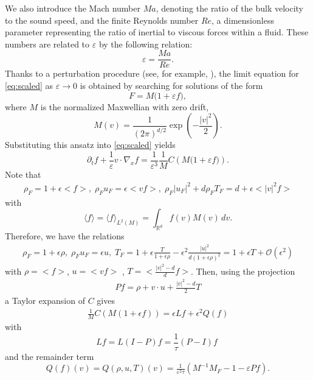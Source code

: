 \documentclass[final,11pt]{siamart251216}
\numberwithin{equation}{section}
\theoremstyle{definition}
\theoremstyle{remark}
\begin{document}
We also introduce the Mach number $Ma$, denoting the ratio of the bulk velocity to the sound speed, and the finite Reynolds number $Re$, a dimensionless parameter representing the ratio of inertial to viscous forces within a fluid.
These numbers are related to $\varepsilon$ by the following relation:
\begin{equation}
	\varepsilon = \frac{Ma}{Re}. \label{eq:eps-ma-re}
\end{equation}
Thanks to a perturbation procedure (see, for example, \cite{Levermore91,Esposito}),
the limit equation for \eqref{eq:scaled} as $\varepsilon \to 0$ is obtained by searching for solutions of the form
\begin{equation}\label{eq:ansatz}
	F = M \big(1 + \varepsilon f \big),
\end{equation}
where $M$ is the normalized Maxwellian with zero drift,
\[
M(v) = \frac{1}{(2\pi)^{d/2}} \exp\!\left(-\frac{|v|^2}{2}\right).
\]
Substituting this ansatz into \eqref{eq:scaled} yields
\begin{equation}
	 \partial_t f + \frac{1}{\varepsilon} v \cdot \nabla_x f
	= \frac{1}{\varepsilon^3}\frac{1}{M}C\left(M \big(1 + \varepsilon f \big)\right).
\end{equation}
Note that 
\begin{align*}
	\rho_F = 1+ \epsilon <f>, \; \rho_F u_F = \epsilon < vf>, \; \rho_F \vert u_F\vert^2 + d \rho_F T_F= d+ \epsilon < \vert v \vert^2 f>
\end{align*}
with
\[
\langle f \rangle = \langle f \rangle_{L^2(M)} = \int_{\mathbb{R}^d} f(v) M(v) \, dv.
\]
Therefore, we have the relations
\begin{align}
	\label{relation}
	\rho_F = 1+ \epsilon \rho, \; \rho_F u_F = \epsilon u, \;  T_F= 1+ \epsilon \frac{T}{1+\epsilon \rho} - \epsilon^2 \frac{\vert u\vert^2}{d(1+\epsilon \rho)^2}=1+ \epsilon T + \mathcal{O}(\epsilon^2)
\end{align}
with
$  \rho = <f> $, $ u = <v f>$ , $  T = <\frac{\vert v\vert^2-d}{d}f> $. 
Then,  using the  projection
\begin{align}
	\label{projection}Pf=  \rho +  v \cdot u+ \frac{\vert v\vert^2-d}{2} T 
\end{align}
a Taylor expansion of $C$ gives 
\begin{align}
	\label{expansion}
	\frac{1}{M} C(M(1+\epsilon f)) = \epsilon L f + \epsilon^2 Q (f) 
\end{align}
with
$$
Lf = L(I-P)f= \frac{1}{\tau}(P-I) f \; 
$$
and the remainder term
\[
Q(f)(v) =Q(\rho,u,T)(v)= \tfrac{1}{\varepsilon^2 \tau} \left( M^{-1}M_F - 1 - \varepsilon Pf\right).
\] 
\end{document}
